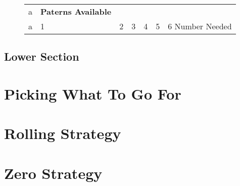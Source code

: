 \documentclass{article}
\begin{document}
\begin{figure}
\begin{table}
  \begin{tabular}{l|l|l|l|l|l|l}
   a & \textbf{Paterns Available}\\
   a & 1 & 2 & 3 & 4 & 5 & 6
   Number Needed &
  \end{tabular}
\end{table}
\end{figure}

\subsection{Lower Section}

\section{Picking What To Go For}

\section{Rolling Strategy}

\section{Zero Strategy}
\end{document}
